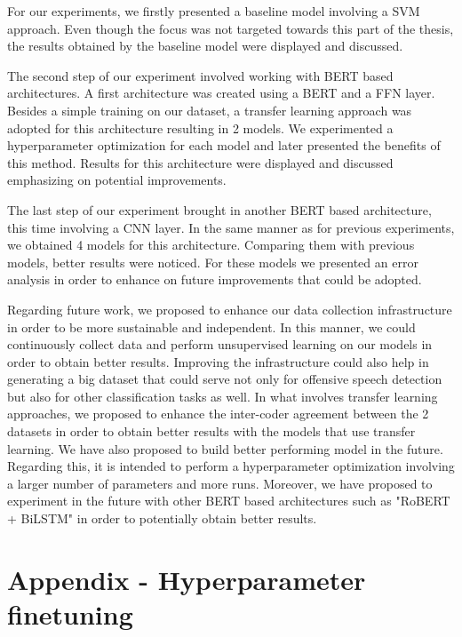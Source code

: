 \documentclass[12pt,a4paper]{report}
\begin{document}
For our experiments, we firstly presented a baseline model involving a SVM approach. Even though the focus was not targeted towards this part of the thesis, the results obtained by the baseline model were displayed and discussed.

The second step of our experiment involved working with BERT based architectures. A first architecture was created using a BERT and a FFN layer. Besides a simple training on our dataset, a transfer learning approach was adopted for this architecture resulting in 2 models. We experimented a hyperparameter optimization for each model and later presented the benefits of this method. Results for this architecture were displayed and discussed emphasizing on potential improvements.

The last step of our experiment brought in another BERT based architecture, this time involving a CNN layer. In the same manner as for previous experiments, we obtained 4 models for this architecture. Comparing them with previous models, better results were noticed. For these models we presented an error analysis in order to enhance on future improvements that could be adopted.

Regarding future work, we proposed to enhance our data collection infrastructure in order to be more sustainable and independent. In this manner, we could continuously collect data and perform unsupervised learning on our models in order to obtain better results. Improving the infrastructure could also help in generating a big dataset that could serve not only for offensive speech detection but also for other classification tasks as well.
In what involves transfer learning approaches, we proposed to enhance the inter-coder agreement between the 2 datasets in order to obtain better results with the models that use transfer learning.
We have also proposed to build better performing model in the future. Regarding this, it is intended to perform a hyperparameter optimization involving a larger number of parameters and more runs. Moreover, we have proposed to experiment in the future with other BERT based architectures such as "RoBERT + BiLSTM" in order to potentially obtain better results.






\chapter*{Appendix - Hyperparameter finetuning}
\end{document}
